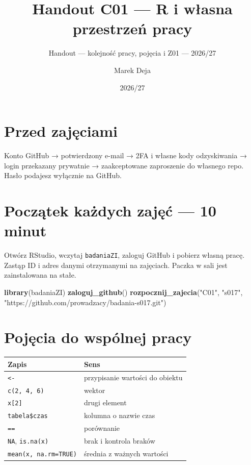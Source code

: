 \documentclass[
  polish,
  11pt,
  a4paper,
]{article}
\title{Handout C01 --- R i własna przestrzeń pracy}
\subtitle{Handout --- kolejność pracy, pojęcia i Z01 --- 2026/27}
\author{Marek Deja}
\date{2026/27}
\newenvironment{Shaded}{\begin{snugshade}}{\end{snugshade}}
\newcommand{\FunctionTok}[1]{\textcolor[rgb]{0.13,0.29,0.53}{\textbf{#1}}}
\newcommand{\NormalTok}[1]{#1}
\newcommand{\StringTok}[1]{\textcolor[rgb]{0.31,0.60,0.02}{#1}}
\newcounter{none} %
\begin{document}
\maketitle

\section{Przed zajęciami}\label{przed-zajux119ciami}

Konto GitHub → potwierdzony e-mail → 2FA i własne kody odzyskiwania →
login przekazany prywatnie → zaakceptowane zaproszenie do własnego repo.
Hasło podajesz wyłącznie na GitHub.

\section{Początek każdych zajęć --- 10
minut}\label{poczux105tek-kaux17cdych-zajux119ux107-10-minut}

Otwórz RStudio, wczytaj \texttt{badaniaZI}, zaloguj GitHub i pobierz
własną pracę. Zastąp ID i adres danymi otrzymanymi na zajęciach. Paczka
w sali jest zainstalowana na stałe.

\begin{Shaded}
\begin{Highlighting}[]
\FunctionTok{library}\NormalTok{(badaniaZI)}
\FunctionTok{zaloguj\_github}\NormalTok{()}
\FunctionTok{rozpocznij\_zajecia}\NormalTok{(}\StringTok{"C01"}\NormalTok{, }\StringTok{"s017"}\NormalTok{,}
  \StringTok{"https://github.com/prowadzacy/badania{-}s017.git"}\NormalTok{)}
\end{Highlighting}
\end{Shaded}

\section{Pojęcia do wspólnej
pracy}\label{pojux119cia-do-wspuxf3lnej-pracy}

{\def\LTcaptype{none} %
\begin{longtable}[]{@{}ll@{}}
\toprule\noalign{}
Zapis & Sens \\
\midrule\noalign{}
\endhead
\bottomrule\noalign{}
\endlastfoot
\texttt{\textless{}-} & przypisanie wartości do obiektu \\
\texttt{c(2,\ 4,\ 6)} & wektor \\
\texttt{x{[}2{]}} & drugi element \\
\texttt{tabela\$czas} & kolumna o nazwie czas \\
\texttt{==} & porównanie \\
\texttt{NA}, \texttt{is.na(x)} & brak i kontrola braków \\
\texttt{mean(x,\ na.rm=TRUE)} & średnia z ważnych wartości \\
\end{longtable}
}
\end{document}

